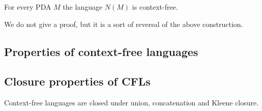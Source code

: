 \begin{page}

\begin{thm}
For every PDA $M$ the language $N(M)$ is context-free.
\end{thm}

\end{page}

\begin{page}

We do not give a proof, but it is a sort of reversal of the above construction.






\end{page}

\begin{page}

\section{Properties of context-free languages}
\subsection{Closure properties of CFLs}

\end{page}

\begin{page}

\begin{thm}
\label{thm:CFLClosed}
Context-free languages are closed under union, concatenation and Kleene closure.
\end{thm}

\end{page}

